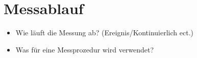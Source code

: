 \section{Messablauf}
\label{sec:Messablauf}

\begin{itemize}
    \item Wie läuft die Messung ab? (Ereignis/Kontinuierlich ect.)
    \item Was für eine Messprozedur wird verwendet?
\end{itemize}